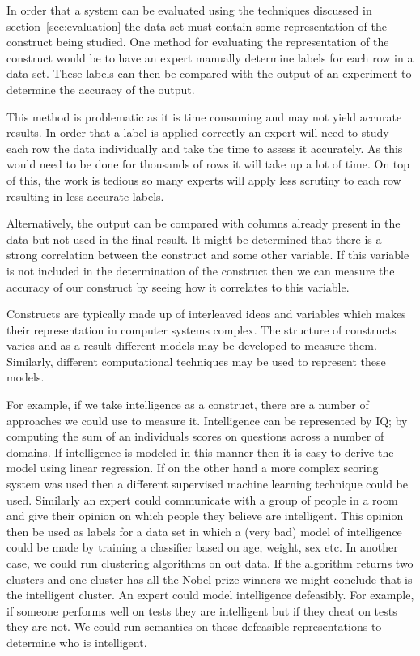 In order that a system can be evaluated using the techniques discussed in  section~\ref{sec:evaluation} the data set must contain some representation of the construct being studied. One method for evaluating the representation of the construct would be to have an expert manually determine labels for each row in a data set. These labels can then be compared with the output of an experiment to determine the accuracy of the output. 

This method is problematic as it is time consuming and may not yield accurate results. In order that a label is applied correctly an expert will need to study each row the data individually and take the time to assess it accurately. As this would need to be done for thousands of rows it will take up a lot of time. On top of this, the work is tedious so many experts will apply less scrutiny to each row resulting in less accurate labels.

Alternatively, the output can be compared with columns already present in the data but not used in the final result. It might be determined that there is a strong correlation between the construct and some other variable. If this variable is not included in the determination of the construct then we can measure the accuracy of our construct by seeing how it correlates to this variable.

Constructs are typically made up of interleaved ideas and variables which makes their representation in computer systems complex. The structure of constructs varies and as a result different models may be developed to measure them. Similarly, different computational techniques may be used to represent these models.

For example, if we take intelligence as a construct, there are a number of approaches we could use to measure it. Intelligence can be represented by IQ; by computing the sum of an individuals scores on questions across a number of domains. If intelligence is modeled in this manner then it is easy to derive the model using linear regression. If on the other hand a more complex scoring system was used then a different supervised machine learning technique could be used. Similarly an expert could communicate with a group of people in a room and give their opinion on which people they believe are intelligent. This opinion then be used as labels for a data set in which a (very bad) model of intelligence could be made by training a classifier based on age, weight, sex etc. In another case, we could run clustering algorithms on out data. If the algorithm returns two clusters and one cluster has all the Nobel prize winners we might conclude that is the intelligent cluster. An expert could model intelligence defeasibly. For example, if someone performs well on tests they are intelligent but if they cheat on tests they are not. We could run semantics on those defeasible representations to determine who is intelligent.

